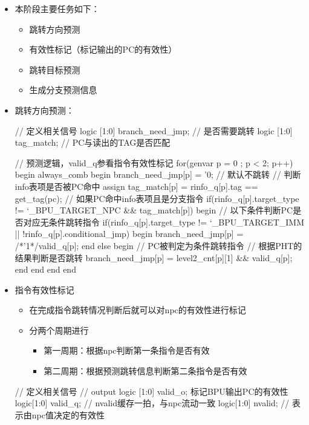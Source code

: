 \begin{itemize}
\item
  本阶段主要任务如下：

  \begin{itemize}
  \tightlist
  \item
    跳转方向预测
  \item
    有效性标记（标记输出的PC的有效性）
  \item
    跳转目标预测
  \item
    生成分支预测信息
  \end{itemize}
\item
  跳转方向预测：

\begin{CodeBlock}[language=BookSystemVerilog]
// 定义相关信号
logic [1:0] branch_need_jmp;  // 是否需要跳转
logic [1:0] tag_match;  // PC与读出的TAG是否匹配

// 预测逻辑，valid_q参看指令有效性标记
for(genvar p = 0 ; p < 2; p++) begin
  always_comb begin
    branch_need_jmp[p] = '0; // 默认不跳转
    // 判断info表项是否被PC命中
    assign tag_match[p] = rinfo_q[p].tag == get_tag(pc);
    // 如果PC命中info表项且是分支指令
    if(rinfo_q[p].target_type != `_BPU_TARGET_NPC && tag_match[p]) begin
      // 以下条件判断PC是否对应无条件跳转指令
      if(rinfo_q[p].target_type != `_BPU_TARGET_IMM || !rinfo_q[p].conditional_jmp) begin
        branch_need_jmp[p] = /*'1*/valid_q[p];
      end
      else begin
        // PC被判定为条件跳转指令
        // 根据PHT的结果判断是否跳转
        branch_need_jmp[p] = level2_cnt[p][1] && valid_q[p];
      end
    end
  end
end
\end{CodeBlock}
\item
  指令有效性标记

  \begin{itemize}
  \tightlist
  \item
    在完成指令跳转情况判断后就可以对npc的有效性进行标记
  \item
    分两个周期进行

    \begin{itemize}
    \tightlist
    \item
      第一周期：根据npc判断第一条指令是否有效
    \item
      第二周期：根据预测跳转信息判断第二条指令是否有效
    \end{itemize}
  \end{itemize}

\begin{CodeBlock}[language=BookSystemVerilog]
// 定义相关信号
// output logic [1:0] valid_o; 标记BPU输出PC的有效性
logic[1:0] valid_q;  // nvalid缓存一拍，与npc流动一致
logic[1:0] nvalid;   // 表示由npc值决定的有效性


\end{CodeBlock}
\end{itemize}

